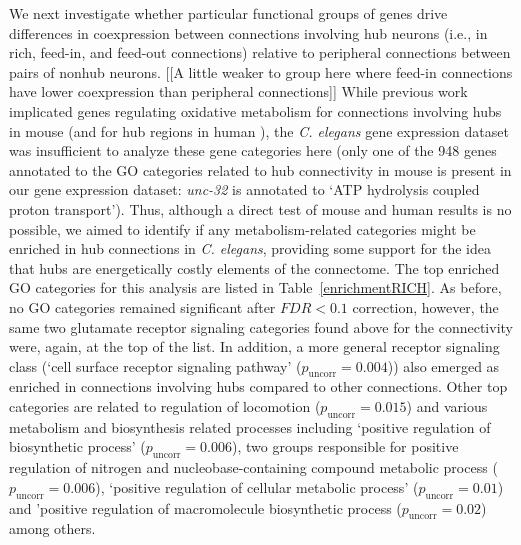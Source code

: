 \documentclass[10pt,letterpaper]{article}
\begin{document}
We next investigate whether particular functional groups of genes drive differences in coexpression between connections involving hub neurons (i.e., in rich, feed-in, and feed-out connections) relative to peripheral connections between pairs of nonhub neurons.
[[A little weaker to group here where feed-in connections have lower coexpression than peripheral connections]]
While previous work implicated genes regulating oxidative metabolism for connections involving hubs in mouse \cite{Fulcher:2016ck} (and for hub regions in human \cite{Vertes2016a}), the \emph{C. elegans} gene expression dataset was insufficient to analyze these gene categories here (only one of the 948 genes annotated to the GO categories related to hub connectivity in mouse is present in our gene expression dataset: \emph{unc-32} is annotated to `ATP hydrolysis coupled proton transport').
Thus, although a direct test of mouse and human results is no possible, we aimed to identify if any metabolism-related categories might be enriched in hub connections in \emph{C. elegans}, providing some support for the idea that hubs are energetically costly elements of the connectome.
The top enriched GO categories for this analysis are listed in Table~\ref{enrichmentRICH}.
As before, no GO categories remained significant after $FDR<0.1$ correction, however, the same two glutamate receptor signaling categories found above for the connectivity were, again, at the top of the list. 
In addition, a more general receptor signaling class (`cell surface receptor signaling pathway' ($p_\mathrm{uncorr} = 0.004$)) also emerged as enriched in connections involving hubs compared to other connections.
Other top categories are related to regulation of locomotion ($p_\mathrm{uncorr} = 0.015$) and various metabolism and biosynthesis related processes including `positive regulation of biosynthetic process' ($p_\mathrm{uncorr} = 0.006$), two groups responsible for positive regulation of nitrogen and nucleobase-containing compound metabolic process ($p_\mathrm{uncorr} = 0.006$), `positive regulation of cellular metabolic process' ($p_\mathrm{uncorr} = 0.01$) and 'positive regulation of macromolecule biosynthetic process ($p_\mathrm{uncorr} = 0.02$) among others.  

\end{document}
